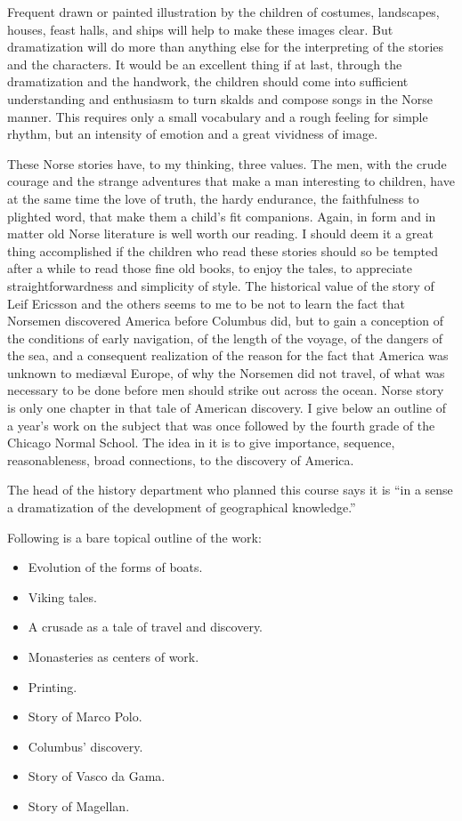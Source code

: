 Frequent drawn or painted illustration by the children of costumes,
landscapes, houses, feast halls, and ships will help to make these
images clear. But dramatization will do more than anything else for the
interpreting of the stories and the characters. It would be an excellent
thing if at last, through the dramatization and the handwork, the
children should come into sufficient understanding and enthusiasm to
turn skalds and compose songs in the Norse manner. This requires only a
small vocabulary and a rough feeling for simple rhythm, but an intensity
of emotion and a great vividness of image.

These Norse stories have, to my thinking, three values. The men, with
the crude courage and the strange adventures that make a man interesting
to children, have at the same time the love of truth, the hardy
endurance, the faithfulness to plighted word, that make them a child's
fit companions. Again, in form and in matter old Norse literature is
well worth our reading. I should deem it a great thing accomplished if
the children who read these stories should so be tempted after a while
to read those fine old books, to enjoy the tales, to appreciate
straightforwardness and simplicity of style. The historical value of the
story of Leif Ericsson and the others seems to me to be not to learn the
fact that Norsemen discovered America before Columbus did, but to gain a
conception of the conditions of early navigation, of the length of the
voyage, of the dangers of the sea, and a consequent realization of the
reason for the fact that America was unknown to mediæval Europe, of why
the Norsemen did not travel, of what was necessary to be done before men
should strike out across the ocean. Norse story is only one chapter in
that tale of American discovery. I give below an outline of a year's
work on the subject that was once followed by the fourth grade of the
Chicago Normal School. The idea in it is to give importance, sequence,
reasonableness, broad connections, to the discovery of America.

The head of the history department who planned this course says it is
``in a sense a dramatization of the development of geographical
knowledge.''

Following is a bare topical outline of the work:

\begin{itemize}
\item Evolution of the forms of boats.
\item Viking tales.
\item A crusade as a tale of travel and discovery.
\item Monasteries as centers of work.
\item Printing.
\item Story of Marco Polo.
\item Columbus' discovery.
\item Story of Vasco da Gama.
\item Story of Magellan.
\end{itemize}

